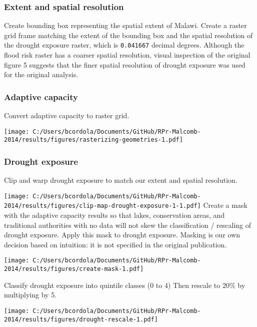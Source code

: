 \documentclass[
]{article}
\begin{document}
\hypertarget{extent-and-spatial-resolution}{%
\subsubsection{Extent and spatial
resolution}\label{extent-and-spatial-resolution}}

Create bounding box representing the spatial extent of Malawi. Create a
raster grid frame matching the extent of the bounding box and the
spatial resolution of the drought exposure raster, which is
\texttt{0.041667} decimal degrees. Although the flood risk raster has a
coarser spatial resolution, visual inspection of the original figure 5
suggests that the finer spatial resolution of drought exposure was used
for the original analysis.

\hypertarget{adaptive-capacity-1}{%
\subsubsection{Adaptive capacity}\label{adaptive-capacity-1}}

Convert adaptive capacity to raster grid.

\texttt{[image: C:/Users/bcordola/Documents/GitHub/RPr-Malcomb-2014/results/figures/rasterizing-geometries-1.pdf]}

\hypertarget{drought-exposure}{%
\subsubsection{Drought exposure}\label{drought-exposure}}

Clip and warp drought exposure to match our extent and spatial
resolution.

\texttt{[image: C:/Users/bcordola/Documents/GitHub/RPr-Malcomb-2014/results/figures/clip-map-drought-exposure-1-1.pdf]}
Create a mask with the adaptive capacity results so that lakes,
conservation areas, and traditional authorities with no data will not
skew the classification / rescaling of drought exposure. Apply this mask
to drought exposure. Masking is our own decision based on intuition: it
is not specified in the original publication.

\texttt{[image: C:/Users/bcordola/Documents/GitHub/RPr-Malcomb-2014/results/figures/create-mask-1.pdf]}

Classify drought exposure into quintile classes (0 to 4) Then rescale to
20\% by multiplying by 5.

\texttt{[image: C:/Users/bcordola/Documents/GitHub/RPr-Malcomb-2014/results/figures/drought-rescale-1.pdf]}
\end{document}
